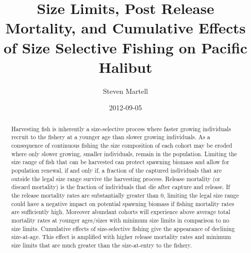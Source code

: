 \documentclass[leqno,author,preprint]{nrc2}
\title{Size Limits, Post Release Mortality, and Cumulative Effects of Size Selective Fishing on Pacific Halibut}
\author{ Steven Martell }
\date{2012-09-05}
\begin{document}
\ifpdf
{}
\else
{}
\fi




\begin{abstract}
	Harvesting fish is inherently a size-selective process where faster growing individuals recruit to the fishery at a younger age than slower growing individuals.  As a consequence of continuous fishing the size composition of each cohort may be eroded where only slower growing, smaller individuals, remain in the population.  Limiting the size range of fish that can be harvested can protect spawning biomass and allow for population renewal, if and only if, a fraction of the captured individuals that are outside the legal size range survive the harvesting process.  Release mortality (or discard mortality) is the fraction of individuals that die after capture and release.  If the release mortality rates are substantially greater than 0, limiting the legal size range could have a negative impact on potential spawning biomass if fishing mortality rates are sufficiently high.  Moreover abundant cohorts will experience above average total mortality rates at younger ages/sizes with minimum size limits in comparison to no size limits.  Cumulative effects of size-selective fishing give the appearance of declining size-at-age.  This effect is amplified with higher release mortality rates and minimum size limits that are much greater than the size-at-entry to the fishery.
	
\end{abstract}
\maketitle





\end{document}
